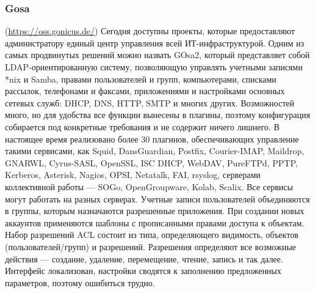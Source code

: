 \subsubsection{Gosa}(\url{https://oss.gonicus.de/}) Сегодня доступны проекты, которые предоставляют администратору единый центр управления всей ИТ-инфраструктурой. Одним из самых продвинутых решений можно назвать GOsa2, который представляет собой LDAP-ориентированную систему, позволяющую управлять учетными записями *nix и Samba, правами пользователей и групп, компьютерами, списками рассылок, телефонами и факсами, приложениями и настройками основных сетевых служб: DHCP, DNS, HTTP, SMTP и многих других.
Возможностей много, но для удобства все функции вынесены в плагины, поэтому конфигурация собирается под конкретные требования и не содержит ничего лишнего. В настоящее время реализовано более 30 плагинов, обеспечивающих управление такими сервисами, как Squid, DansGuardian, Postfix, Courier-IMAP, Maildrop, GNARWL, Cyrus-SASL, OpenSSL, ISC DHCP, WebDAV, PureFTPd, PPTP, Kerberos, Asterisk, Nagios, OPSI, Netatalk, FAI, rsyslog, серверами коллективной работы — SOGo, OpenGroupware, Kolab, Scalix. Все сервисы могут работать на разных серверах.
Учетные записи пользователей объединяются в группы, которым назначаются разрешенные приложения. При создании новых аккаунтов применяются шаблоны с прописанными правами доступа к объектам. Набор разрешений ACL состоит из типа, определяющего видимость, объектов (пользователей/групп) и разрешений. Разрешения определяют все возможные действия — создание, удаление, перемещение, чтение, запись и так далее. Интерфейс локализован, настройки сводятся к заполнению предложенных параметров, поэтому ошибиться трудно.

